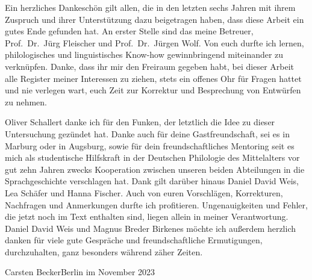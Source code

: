 Ein herzliches Dankeschön gilt allen, die in den letzten sechs Jahren mit ihrem
Zuspruch und ihrer Unterstützung dazu beigetragen haben, dass diese Arbeit ein
gutes Ende gefunden hat. An erster Stelle sind das meine Betreuer,
Prof.~Dr.~Jürg Fleischer und Prof.~Dr.~Jürgen Wolf. Von euch durfte ich lernen,
philologisches und linguistisches Know-how gewinnbringend miteinander zu
verknüpfen. Danke, dass ihr mir den Freiraum gegeben habt, bei dieser Arbeit
alle Register meiner Interessen zu ziehen, stets ein offenes Ohr für Fragen
hattet und nie verlegen wart, euch Zeit zur Korrektur und Besprechung von
Entwürfen zu nehmen.

Oliver Schallert danke ich für den Funken, der letztlich die Idee zu dieser
Untersuchung gezündet hat. Danke auch für deine Gastfreundschaft, sei es in
Marburg oder in Augsburg, sowie für dein freundschaftliches Mentoring seit es
mich als studentische Hilfskraft in der Deutschen Philologie des Mittelalters
vor gut zehn Jahren zwecks Kooperation zwischen unseren beiden Abteilungen in
die Sprachgeschichte verschlagen hat. Dank gilt darüber hinaus Daniel David
Weis, Lea Schäfer und Hanna Fischer. Auch von euren Vorschlägen, Korrekturen,
Nachfragen und Anmerkungen durfte ich profitieren. Ungenauigkeiten und Fehler,
die jetzt noch im Text enthalten sind, liegen allein in meiner Verantwortung.
Daniel David Weis und Magnus Breder Birkenes möchte ich außerdem herzlich
danken für viele gute Gespräche und freundschaftliche Ermutigungen,
durchzuhalten, ganz besonders während zäher Zeiten.
\bigskip

\noindent%
Carsten Becker\hfill Berlin im November 2023

